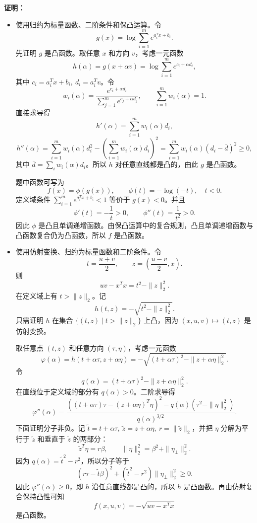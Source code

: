 \documentclass[12pt,a4paper]{article}
\begin{document}
\textbf{证明：}
\begin{itemize}
  \item[(a)] 使用归约为标量函数、二阶条件和保凸运算。令
  \[
    g(x)=\log\sum_{i=1}^m e^{a_i^Tx+b_i}.
  \]
  先证明 $g$ 是凸函数。取任意 $x$ 和方向 $v$，考虑一元函数
  \[
    h(\alpha)=g(x+\alpha v)
    =\log\sum_{i=1}^m e^{c_i+\alpha d_i},
  \]
  其中 $c_i=a_i^Tx+b_i,\ d_i=a_i^Tv$。令
  \[
    w_i(\alpha)=\frac{e^{c_i+\alpha d_i}}
    {\sum_{j=1}^m e^{c_j+\alpha d_j}},
    \qquad \sum_{i=1}^m w_i(\alpha)=1.
  \]
  直接求导得
  \[
    h'(\alpha)=\sum_{i=1}^m w_i(\alpha)d_i,
  \]
  \[
    h''(\alpha)=
    \sum_{i=1}^m w_i(\alpha)d_i^2
    -\left(\sum_{i=1}^m w_i(\alpha)d_i\right)^2
    =\sum_{i=1}^m w_i(\alpha)(d_i-\bar d)^2\geq 0,
  \]
  其中 $\bar d=\sum_i w_i(\alpha)d_i$。所以 $h$ 对任意直线都是凸的，由此 $g$ 是凸函数。

  题中函数可写为
  \[
    f(x)=\phi(g(x)),\qquad \phi(t)=-\log(-t),\quad t<0.
  \]
  定义域条件 $\sum_{i=1}^m e^{a_i^Tx+b_i}<1$ 等价于 $g(x)<0$。并且
  \[
    \phi'(t)=-\frac{1}{t}>0,\qquad
    \phi''(t)=\frac{1}{t^2}>0.
  \]
  因此 $\phi$ 是凸且单调递增函数。由保凸运算中的复合规则，凸且单调递增函数与凸函数复合仍为凸函数，所以 $f$ 是凸函数。

  \item[(b)] 使用仿射变换、归约为标量函数和二阶条件。令
  \[
    t=\frac{u+v}{2},\qquad
    z=\left(\frac{u-v}{2},x\right).
  \]
  则
  \[
    uv-x^Tx=t^2-\|z\|_2^2.
  \]
  在定义域上有 $t>\|z\|_2$。记
  \[
    h(t,z)=-\sqrt{t^2-\|z\|_2^2}.
  \]
  只需证明 $h$ 在集合 $\{(t,z)\mid t>\|z\|_2\}$ 上凸，因为 $(x,u,v)\mapsto(t,z)$ 是仿射变换。

  取任意点 $(t,z)$ 和任意方向 $(\tau,\eta)$，考虑一元函数
  \[
    \varphi(\alpha)
    =h(t+\alpha\tau,z+\alpha\eta)
    =-\sqrt{(t+\alpha\tau)^2-\|z+\alpha\eta\|_2^2}.
  \]
  令
  \[
    q(\alpha)=(t+\alpha\tau)^2-\|z+\alpha\eta\|_2^2.
  \]
  在直线位于定义域的部分有 $q(\alpha)>0$。二阶求导得
  \[
    \varphi''(\alpha)
    =
    \frac{\left((t+\alpha\tau)\tau-(z+\alpha\eta)^T\eta\right)^2
    -q(\alpha)(\tau^2-\|\eta\|_2^2)}
    {q(\alpha)^{3/2}}.
  \]
  下面证明分子非负。记 $\tilde t=t+\alpha\tau,\ \tilde z=z+\alpha\eta,\ r=\|\tilde z\|_2$，并把 $\eta$ 分解为平行于 $\tilde z$ 和垂直于 $\tilde z$ 的两部分：
  \[
    \tilde z^T\eta=r\beta,\qquad
    \|\eta\|_2^2=\beta^2+\|\eta_\perp\|_2^2.
  \]
  因为 $q(\alpha)=\tilde t^2-r^2$，所以分子等于
  \[
    (r\tau-\tilde t\beta)^2+(\tilde t^2-r^2)\|\eta_\perp\|_2^2\geq 0.
  \]
  因此 $\varphi''(\alpha)\geq 0$，即 $h$ 沿任意直线都是凸的，所以 $h$ 是凸函数。再由仿射复合保持凸性可知
  \[
    f(x,u,v)=-\sqrt{uv-x^Tx}
  \]
  是凸函数。
\end{itemize}
\end{document}
